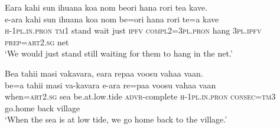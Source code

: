 \ea\label{ex:text24-14}
Eara kahi sun ihuana koa nom beori hana rori tea kave.\\
\gll e-ara	kahi	sun	ihuana	koa	nom	be=ori	hana	rori	te=a	kave\\
     \textsc{h}-1\textsc{pl}.\textsc{in}.\textsc{pron}	\textsc{tm}1	stand	wait	just	\textsc{ipfv}	\textsc{compl}2=3\textsc{pl}.\textsc{pron}	hang	3\textsc{pl}.\textsc{ipfv}	\textsc{prep}=\textsc{art}2.\textsc{sg}	net\\
\glt `We would just stand still waiting for them to hang in the net.'
\z

\ea\label{ex:text24-15}
Bea tahii masi vakavara, eara repaa voosu vahaa vaan.\\
\gll be=a	tahii	masi	va-kavara	e-ara	re=paa	voosu	vahaa	vaan\\
     when=\textsc{art}2.\textsc{sg}	sea	be.at.low.tide	\textsc{advr}-complete	\textsc{h}-1\textsc{pl}.\textsc{in}.\textsc{pron}	\textsc{consec}=\textsc{tm}3	go.home	back	village\\
\glt `When the sea is at low tide, we go home back to the village.'
\z